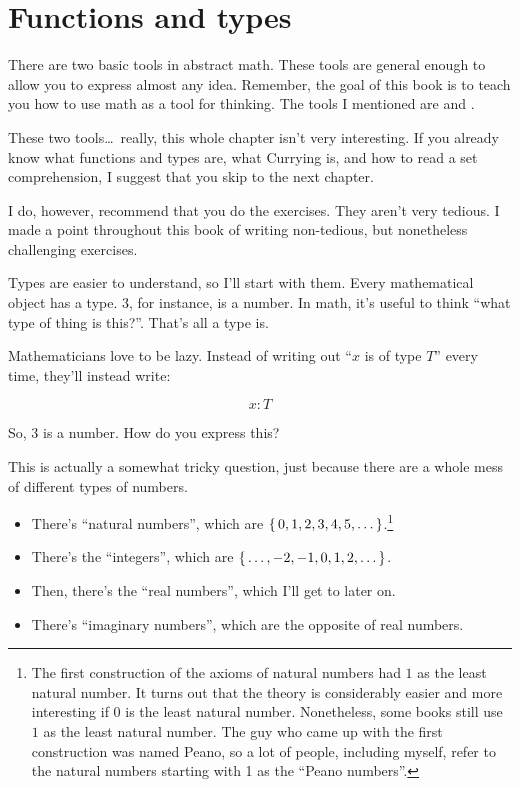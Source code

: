 \chapter{Functions and types}
\label{ch:functions}

There are two basic tools in abstract math. These tools are general enough to
allow you to express almost any idea. Remember, the goal of this book is to
teach you how to use math as a tool for thinking. The tools I mentioned are
 and .

These two tools\dots\ really, this whole chapter isn't very interesting. If you
already know what functions and types are, what Currying is, and how to read a
set comprehension, I suggest that you skip to the next chapter.

I do, however, recommend that you do the exercises. They aren't very tedious. I
made a point throughout this book of writing non-tedious, but nonetheless
challenging exercises.


Types are easier to understand, so I'll start with them. Every mathematical
object has a type. $3$, for instance, is a number. In math, it's useful to think
``what type of thing is this?''. That's all a type is.

Mathematicians love to be lazy. Instead of writing out ``$x$ is of type $T$''
every time, they'll instead write:

\begin{equation}
    x : T
\end{equation}

So, $3$ is a number. How do you express this?

This is actually a somewhat tricky question, just because there are a whole mess
of different types of numbers.

\begin{itemize}
  \item There's ``natural numbers'', which are
    $\left\{\, 0, 1, 2, 3, 4, 5, \dots \,\right\}$.\footnote{The first construction of the
      axioms of natural numbers had $1$ as the least natural number. It turns
      out that the theory is considerably easier and more interesting if $0$ is
      the least natural number. Nonetheless, some books still use $1$ as the
      least natural number. The guy who came up with the first construction was
      named Peano, so a lot of people, including myself, refer to the natural
      numbers starting with 1 as the ``Peano numbers''.}
  \item There's the ``integers'', which are
    \(\left\{\, \dots, -2, -1, 0, 1, 2, \dots \,\right\}\).
  \item Then, there's the ``real numbers'', which I'll get to later on.
  \item There's ``imaginary numbers'', which are the opposite of real
    numbers.
\end{itemize}

